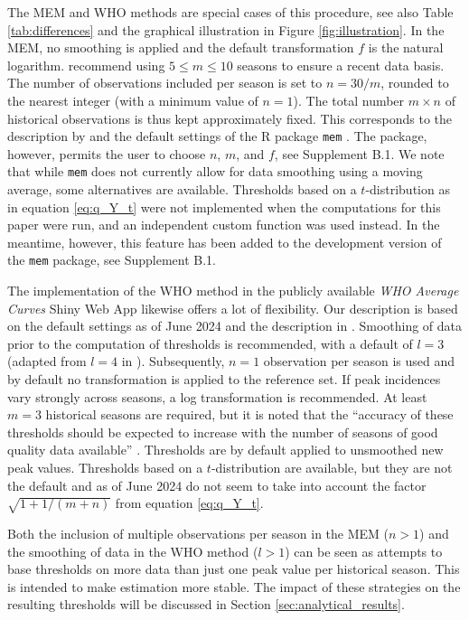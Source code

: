\documentclass[12pt]{article}
\begin{document}
The MEM and WHO methods are special cases of this procedure, see also Table \ref{tab:differences} and the graphical illustration in Figure \ref{fig:illustration}. In the MEM, no smoothing is applied and the default transformation $f$ is the natural logarithm.  \cite{Vega2015} recommend using $5 \leq m \leq 10$ seasons to ensure a recent data basis. The number of observations included per season is set to $n = 30/m$, rounded to the nearest integer (with a minimum value of $n = 1$). The total number $m \times n$ of historical observations is thus kept approximately fixed. This corresponds to the description by \cite{Vega2015} and the default settings of the R package \texttt{mem} \citep{Lozano2020}. The package, however, permits the user to choose $n$, $m$, and $f$, see Supplement B.1. We note that while \texttt{mem} does not currently allow for data smoothing using a moving average, some alternatives are available. Thresholds based on a $t$-distribution as in equation \eqref{eq:q_Y_t} were not implemented when the computations for this paper were run, and an independent custom function was used instead. In the meantime, however, this feature has been added to the development version of the \texttt{mem} package, see Supplement B.1.

The implementation of the WHO method in the publicly available \textit{WHO Average Curves} Shiny Web App \citep{WHO2023} likewise offers a lot of flexibility. Our description is based on the default settings as of June 2024 and the description in \cite{WHO2014}. Smoothing of data prior to the computation of thresholds is recommended, with a default of $l = 3$ (adapted from $l = 4$ in \citealt[p68]{WHO2014}). Subsequently, $n = 1$ observation per season is used and by default no transformation is applied to the reference set. If peak incidences vary strongly across seasons, a log transformation is recommended. At least $m = 3$ historical seasons are required, but it is noted that the ``accuracy of these thresholds should be expected to increase with the number of seasons of good quality data available'' \cite[p22]{WHO2023}. Thresholds are by default applied to unsmoothed new peak values. Thresholds based on a $t$-distribution are available, but they are not the default and as of June 2024 do not seem to take into account the factor $\sqrt{1 + 1/(m + n)}$ from equation \eqref{eq:q_Y_t}.


Both the inclusion of multiple observations per season in the MEM ($n > 1$) and the smoothing of data in the WHO method ($l > 1$) can be seen as attempts to base thresholds on more data than just one peak value per historical season. This is intended to make estimation more stable. The impact of these strategies on the resulting thresholds will be discussed in Section \ref{sec:analytical_results}.
\end{document}
